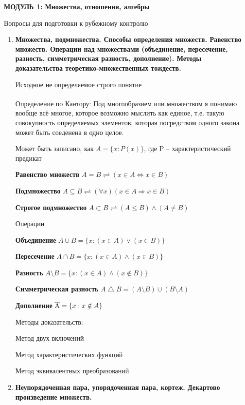 \documentclass[]{article}
\title{}
\author{}
\begin{document}
\textbf{МОДУЛЬ 1: Множества, отношения, алгебры}


Вопросы для подготовки к рубежному контролю

\bigskip

\begin{enumerate}
\item %
\textbf {Множества, подмножества. Способы определения множеств. Равенство множеств. Операции над множествами (объединение, пересечение, разность, симметрическая разность, дополнение). Методы доказательства теоретико-множественных тождеств.}

\hrulefill

Исходное не определяемое строго понятие\\\\
Определение по Кантору: Под многообразием или множеством я понимаю вообще всё многое, которое возможно мыслить как единое, т.е. такую совокупность определяемых элементов, которая посредством одного закона может быть соеденена в одно целое.

Может быть записано, как $A = \{x: P(x)\}$, где P -- характеристический предикат

\textbf{Равенство множеств}
$A = B \rightleftharpoons (x \in A \iff x \in B)$

\textbf{Подмножество} $A \subseteq B \rightleftharpoons (\forall x) (x \in A \Rightarrow x \in B)$

\textbf{Строгое подмножество} $A \subset B \rightleftharpoons (A \leq B) \land (A \neq B)$

Операции

\textbf{Объединение} $A \cup  B = \{x: (x \in A) \lor (x \in B) \}$

\textbf{Пересечение} $A \cap B = \{x: (x \in A) \land (x \in B) \}$

\textbf{Разность} $A \setminus B = \{x: (x \in A) \land (x \notin B) \}$ 

\textbf{Симметрическая разность} $A \bigtriangleup B = (A \setminus B) \cup (B \setminus A)$

\textbf{Дополнение} $\overline{\rm A} = \{x: x \notin A\}$

Методы доказательств:  

Метод двух включений

Метод характеристических функций

Метод эквивалентных преобразований

\hrulefill
\item %
\textbf{Неупорядоченная пара, упорядоченная пара, кортеж. Декартово произведение множеств.}


\end{enumerate}
\end{document}
